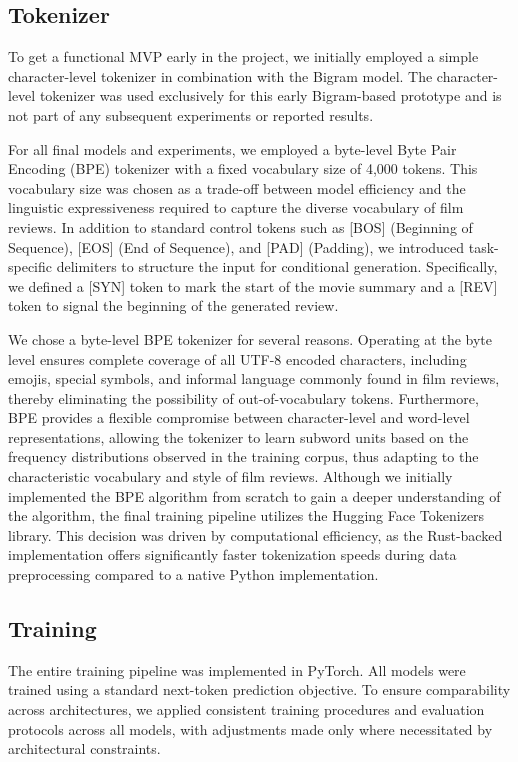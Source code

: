 \subsection{Tokenizer} \label{subsec:tokenizer}
To get a functional MVP early in the project, we initially employed a simple character-level tokenizer in combination with the Bigram model.
The character-level tokenizer was used exclusively for this early Bigram-based prototype and is not part of any subsequent experiments or reported results.

For all final models and experiments, we employed a byte-level Byte Pair Encoding (BPE) tokenizer with a fixed vocabulary size of 4{,}000 tokens.
This vocabulary size was chosen as a trade-off between model efficiency and the linguistic expressiveness required to capture the diverse vocabulary of film reviews.
In addition to standard control tokens such as [BOS] (Beginning of Sequence), [EOS] (End of Sequence), and [PAD] (Padding), we introduced task-specific delimiters to structure the input for conditional generation.
Specifically, we defined a [SYN] token to mark the start of the movie summary and a [REV] token to signal the beginning of the generated review.

We chose a byte-level BPE tokenizer for several reasons.
Operating at the byte level ensures complete coverage of all UTF-8 encoded characters, including emojis, special symbols, and informal language commonly found in film reviews, thereby eliminating the possibility of out-of-vocabulary tokens.
Furthermore, BPE provides a flexible compromise between character-level and word-level representations, allowing the tokenizer to learn subword units based on the frequency distributions observed in the training corpus, thus adapting to the characteristic vocabulary and style of film reviews.
Although we initially implemented the BPE algorithm from scratch to gain a deeper understanding of the algorithm, the final training pipeline utilizes the Hugging Face Tokenizers library.
This decision was driven by computational efficiency, as the Rust-backed implementation offers significantly faster tokenization speeds during data preprocessing compared to a native Python implementation.


\subsection{Training} \label{subsec:training}
The entire training pipeline was implemented in PyTorch. All models were trained using a standard next-token prediction objective.
To ensure comparability across architectures, we applied consistent training procedures and evaluation protocols across all models, with adjustments made only where necessitated by architectural constraints.

